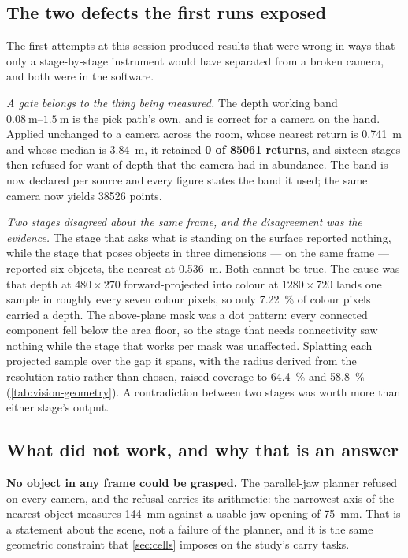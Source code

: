 \subsection{The two defects the first runs exposed}

The first attempts at this session produced results that were wrong in ways
that only a stage-by-stage instrument would have separated from a broken
camera, and both were in the software.

\emph{A gate belongs to the thing being measured.} The depth working band
$\SIrange{0.08}{1.5}{\metre}$ is the pick path's own, and is correct for a
camera on the hand. Applied unchanged to a camera across the room, whose
nearest return is \SI{0.741}{\metre} and whose median is \SI{3.84}{\metre}, it
retained \textbf{\num{0} of \num{85061} returns}, and sixteen stages then
refused for want of depth that the camera had in abundance. The band is now
declared per source and every figure states the band it used; the same camera
now yields \num{38526} points.

\emph{Two stages disagreed about the same frame, and the disagreement was the
evidence.} The stage that asks what is standing on the surface reported
nothing, while the stage that poses objects in three dimensions --- on the
same frame --- reported six objects, the nearest at \SI{0.536}{\metre}. Both
cannot be true. The cause was that depth at $\num{480}\times\num{270}$
forward-projected into colour at $\num{1280}\times\num{720}$ lands one sample
in roughly every seven colour pixels, so only \SI{7.22}{\percent} of colour
pixels carried a depth. The above-plane mask was a dot pattern: every
connected component fell below the area floor, so the stage that needs
connectivity saw nothing while the stage that works per mask was unaffected.
Splatting each projected sample over the gap it spans, with the radius derived
from the resolution ratio rather than chosen, raised coverage to
\SI{64.4}{\percent} and \SI{58.8}{\percent}
(\cref{tab:vision-geometry}). A contradiction between two stages was worth
more than either stage's output.

\subsection{What did not work, and why that is an answer}

\textbf{No object in any frame could be grasped.} The parallel-jaw planner
refused on every camera, and the refusal carries its arithmetic: the narrowest
axis of the nearest object measures \SI{144}{\milli\metre} against a usable
jaw opening of \SI{75}{\milli\metre}. That is a statement about the scene, not
a failure of the planner, and it is the same geometric constraint that
\cref{sec:cells} imposes on the study's carry tasks.


